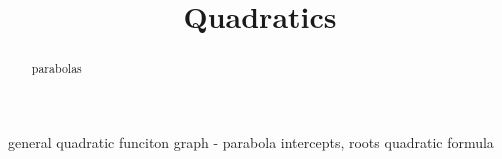 \documentclass{ximera}
\title{Quadratics}
\begin{document}
\begin{abstract}
parabolas
\end{abstract}
\maketitle



general quadratic funciton
graph - parabola
intercepts, roots
quadratic formula
\end{document}
